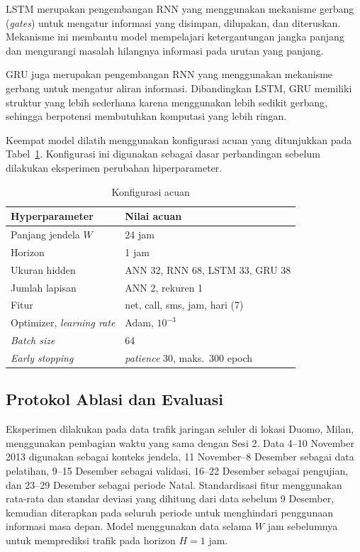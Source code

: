 \documentclass[conference,a4paper]{IEEEtran}
\begin{document}
LSTM merupakan pengembangan RNN yang menggunakan mekanisme gerbang (\textit{gates}) untuk mengatur informasi yang disimpan, dilupakan, dan diteruskan. Mekanisme ini membantu model mempelajari ketergantungan jangka panjang dan mengurangi masalah hilangnya informasi pada urutan yang panjang.

GRU juga merupakan pengembangan RNN yang menggunakan mekanisme gerbang untuk mengatur aliran informasi. Dibandingkan LSTM, GRU memiliki struktur yang lebih sederhana karena menggunakan lebih sedikit gerbang, sehingga berpotensi membutuhkan komputasi yang lebih ringan.

Keempat model dilatih menggunakan konfigurasi acuan yang ditunjukkan pada Tabel~\ref{tab:acuan}. Konfigurasi ini digunakan sebagai dasar perbandingan sebelum dilakukan eksperimen perubahan hiperparameter.

\begin{table}[t]
  \centering
  \caption{Konfigurasi acuan}
  \label{tab:acuan}
  \begin{tabular}{@{}ll@{}}
    \toprule
    Hyperparameter & Nilai acuan \\
    \midrule
    Panjang jendela $W$ & 24 jam \\
    Horizon & 1 jam \\
    Ukuran hidden & ANN 32, RNN 68, LSTM 33, GRU 38 \\
    Jumlah lapisan & ANN 2, rekuren 1 \\
    Fitur & net, call, sms, jam, hari (7) \\
    Optimizer, \textit{learning rate} & Adam, $10^{-3}$ \\
    \textit{Batch size} & 64 \\
    \textit{Early stopping} & \textit{patience} 30, maks.\ 300 epoch \\
    \bottomrule
  \end{tabular}
\end{table}

\subsection{Protokol Ablasi dan Evaluasi}
Eksperimen dilakukan pada data trafik jaringan seluler di lokasi Duomo, Milan, menggunakan pembagian waktu yang sama dengan Sesi 2. Data 4--10 November 2013 digunakan sebagai konteks jendela, 11 November--8 Desember sebagai data pelatihan, 9--15 Desember sebagai validasi, 16--22 Desember sebagai pengujian, dan 23--29 Desember sebagai periode Natal. Standardisasi fitur menggunakan rata-rata dan standar deviasi yang dihitung dari data sebelum 9 Desember, kemudian diterapkan pada seluruh periode untuk menghindari penggunaan informasi masa depan. Model menggunakan data selama $W$ jam sebelumnya untuk memprediksi trafik pada horizon $H=1$ jam.
\end{document}
